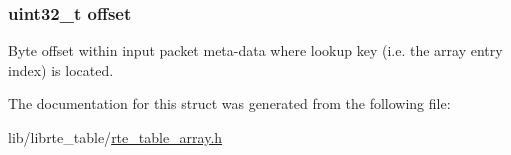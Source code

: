 \subsubsection[{offset}]{\setlength{\rightskip}{0pt plus 5cm}uint32\+\_\+t offset}\label{structrte__table__array__params_a894bdfa2d603d8343f8ef01dda6fcd23}
Byte offset within input packet meta-\/data where lookup key (i.\+e. the array entry index) is located. 

The documentation for this struct was generated from the following file\+:\begin{DoxyCompactItemize}
\item 
lib/librte\+\_\+table/\hyperlink{rte__table__array_8h}{rte\+\_\+table\+\_\+array.\+h}\end{DoxyCompactItemize}
